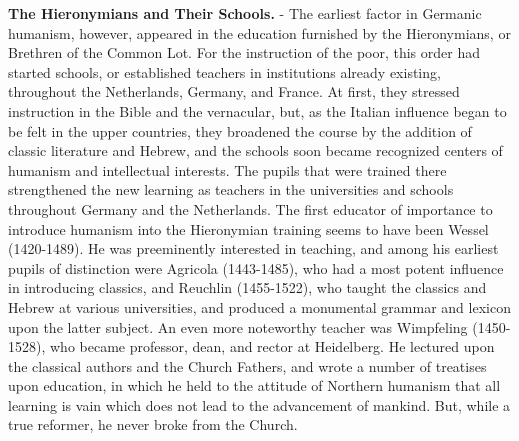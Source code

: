 \documentclass[]{book}
\begin{document}
\textbf{The Hieronymians and Their Schools.} - The earliest factor in Germanic humanism, however, appeared in the education furnished by the Hieronymians, or Brethren of the Common Lot. For the instruction of the poor, this order had started schools, or established teachers in institutions already existing, throughout the Netherlands, Germany, and France. At first, they stressed instruction in the Bible and the vernacular, but, as the Italian influence began to be felt in the upper countries, they broadened the course by the addition of classic literature and Hebrew, and the schools soon became recognized centers of humanism and intellectual interests. The pupils that were trained there strengthened the new learning as teachers in the universities and schools throughout Germany and the Netherlands. The first educator of importance to introduce humanism into the Hieronymian training seems to have been Wessel (1420-1489). He was preeminently interested in teaching, and among his earliest pupils of distinction were Agricola (1443-1485), who had a most potent influence in introducing classics, and Reuchlin (1455-1522), who taught the classics and Hebrew at various universities, and produced a monumental grammar and lexicon upon the latter subject. An even more noteworthy teacher was Wimpfeling (1450-1528), who became professor, dean, and rector at Heidelberg. He lectured upon the classical authors and the Church Fathers, and wrote a number of treatises upon education, in which he held to the attitude of Northern humanism that all learning is vain which does not lead to the advancement of mankind. But, while a true reformer, he never broke from the Church.
\end{document}

